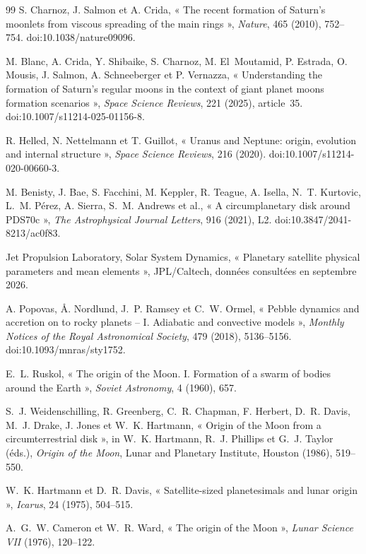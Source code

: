 \documentclass[11pt,a4paper,openany]{report}
\begin{document}
\begin{thebibliography}{99}
 S. Charnoz, J. Salmon et A. Crida, « The recent formation of Saturn's
moonlets from viscous spreading of the main rings », \emph{Nature}, 465 (2010), 752--754.
doi:10.1038/nature09096.

 M. Blanc, A. Crida, Y. Shibaike, S. Charnoz, M. El~Moutamid, P. Estrada,
O. Mousis, J. Salmon, A. Schneeberger et P. Vernazza, « Understanding the formation of Saturn's
regular moons in the context of giant planet moons formation scenarios », \emph{Space Science
Reviews}, 221 (2025), article~35. doi:10.1007/s11214-025-01156-8.

 R. Helled, N. Nettelmann et T. Guillot, « Uranus and Neptune: origin,
evolution and internal structure », \emph{Space Science Reviews}, 216 (2020).
doi:10.1007/s11214-020-00660-3.

 M. Benisty, J. Bae, S. Facchini, M. Keppler, R. Teague, A. Isella,
N.~T. Kurtovic, L.~M. Pérez, A. Sierra, S.~M. Andrews et al., « A circumplanetary disk around
PDS70c », \emph{The Astrophysical Journal Letters}, 916 (2021), L2. doi:10.3847/2041-8213/ac0f83.

 Jet Propulsion Laboratory, Solar System Dynamics, « Planetary satellite physical
parameters and mean elements », JPL/Caltech, données consultées en septembre 2026.

 A. Popovas, Å. Nordlund, J.~P. Ramsey et C.~W. Ormel, « Pebble dynamics and
accretion on to rocky planets -- I. Adiabatic and convective models », \emph{Monthly Notices of the
Royal Astronomical Society}, 479 (2018), 5136--5156. doi:10.1093/mnras/sty1752.

 E.~L. Ruskol, « The origin of the Moon. I. Formation of a swarm of bodies
around the Earth », \emph{Soviet Astronomy}, 4 (1960), 657.

 S.~J. Weidenschilling, R. Greenberg, C.~R. Chapman, F. Herbert,
D.~R. Davis, M.~J. Drake, J. Jones et W.~K. Hartmann, « Origin of the Moon from a circumterrestrial
disk », in W.~K. Hartmann, R.~J. Phillips et G.~J. Taylor (éds.), \emph{Origin of the Moon}, Lunar
and Planetary Institute, Houston (1986), 519--550.

 W.~K. Hartmann et D.~R. Davis, « Satellite-sized planetesimals and
lunar origin », \emph{Icarus}, 24 (1975), 504--515.

 A.~G.~W. Cameron et W.~R. Ward, « The origin of the Moon »,
\emph{Lunar Science VII} (1976), 120--122.


\end{thebibliography}
\end{document}
